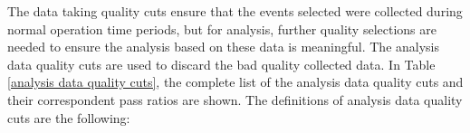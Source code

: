 \begin{comment}
Good Alignment  
6. Good tracker alignment
The tracker alignment of the external tracker planes (Layer 1 and Layer 9) is performed independently by the Perugia and CIEMAT groups. Both alignment procedures should yield a similar set of alignment parameters for a given time period. Two important parameters are the shifts of the whole tracker plane with respect to the inner tracker: ∆X and ∆Y. If the ∆X or ∆Y in Layer 1 between the Perugia / CIEMAT method differs by more than 70 μm the time period is excluded. Likewise if the ∆X or ∆Y in Layer 9 differs by more than 100 μm the time period is excluded as well.

High TRD Occupancy Period
10. Nominal occupancy in TRD
Usually, the mean number of hits recorded in the TRD in each second is ≈ 60. If the mean number of hits per second exceeds 1000, the second will be rejected. This happens frequently at the edges of the SAA or in the pole regions.

No Hardware Errors  
9. Nominal DAQ condition
If hardware errors were detected in the second, reject it. Hardware errors might be bit-flips in the electronic boards, or duplicated events that got recorded, due to problems in the DAQ.

~~~~~~~~~~~~~~~~~~~~~~~~~~~~~~~~~~~~~~~~~~~~~~~~~~~~~~~~~~~~~~~~~~~~~~
My but not in Nico's:
Second Within Run   

Nico's but not in mine:
\end{comment}  	




The data taking quality cuts ensure that the events selected were collected during normal operation time periods, but for analysis, further quality selections are needed to ensure the analysis based on these data is meaningful. The analysis data quality cuts are used to discard the bad quality collected data. In Table \ref{analysis data quality cuts}, the complete list of the analysis data quality cuts and their correspondent pass ratios are shown. The definitions of analysis data quality cuts are the following:  

